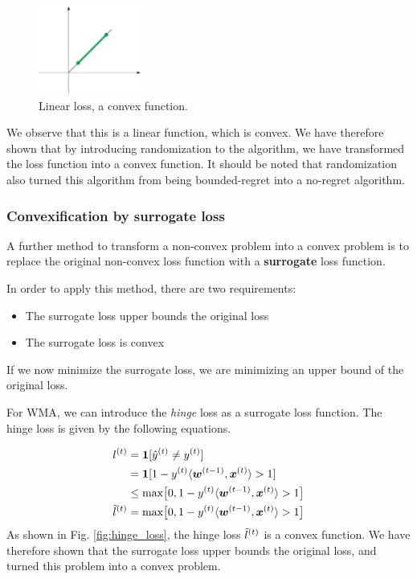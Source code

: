 \documentclass[11pt]{article}
\begin{document}
\begin{figure}[ht]
    \centering
    \includegraphics[width=0.3\textwidth]{linear_loss.png}
    \caption{Linear loss, a convex function.}
    \label{fig:linear_loss}
\end{figure}
We observe that this is a linear function, which is convex. We have therefore shown that by introducing randomization to the algorithm, we have transformed the loss function into a convex function. It should be noted that randomization also turned this algorithm from being bounded-regret into a no-regret algorithm.

\subsubsection*{Convexification by surrogate loss}
A further method to transform a non-convex problem into a convex problem is to replace the original non-convex loss function with a \textbf{surrogate} loss function. 

In order to apply this method, there are two requirements:

\begin{itemize}
    \item The surrogate loss upper bounds the original loss
    \item The surrogate loss is convex
\end{itemize}
If we now minimize the surrogate loss, we are minimizing an upper bound of the original loss.

For WMA, we can introduce the \textit{hinge} loss as a surrogate loss function. The hinge loss is given by the following equations.

\begin{align*}
    l^{(t)} &= \mathbf{1}[\hat{y}^{(t)}\neq y^{(t)}]\\
     &= \mathbf{1}[1-y^{(t)}\langle \boldsymbol{w}^{(t-1)},\boldsymbol{x}^{(t)}\rangle >1]\\
     &\leq     \text{max}\big[0,1-y^{(t)}\langle \boldsymbol{w}^{(t-1)},\boldsymbol{x}^{(t)}\rangle>1\big]\\
     \Tilde{l}^{(t)}&=\text{max}\big[0,1-y^{(t)}\langle \boldsymbol{w}^{(t-1)},\boldsymbol{x}^{(t)}\rangle>1\big]
\end{align*}
As shown in Fig. \ref{fig:hinge_loss}, the hinge loss $\Tilde{l}^{(t)}$ is a convex function.
We have therefore shown that the surrogate loss upper bounds the original loss, and turned this problem into a convex problem.
\end{document}
